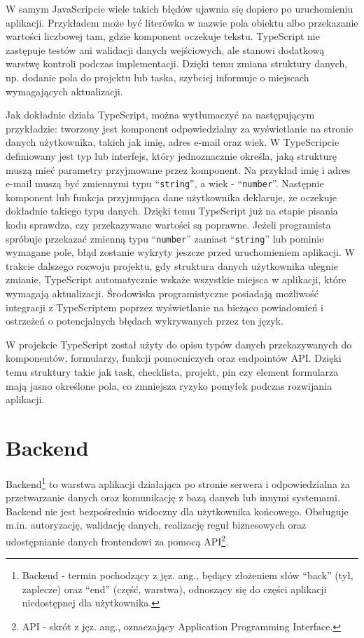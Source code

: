 \documentclass[12pt,a4paper,twoside]{report}
\newcommand{\FirstParagraph}{\noindent\ignorespaces}
\begin{document}
W samym JavaScripcie wiele takich błędów ujawnia się dopiero po uruchomieniu aplikacji. Przykładem może być literówka w nazwie pola obiektu albo przekazanie wartości liczbowej tam, gdzie komponent oczekuje tekstu. TypeScript nie zastępuje testów ani walidacji danych wejściowych, ale stanowi dodatkową warstwę kontroli podczas implementacji. Dzięki temu zmiana struktury danych, np. dodanie pola do projektu lub taska, szybciej informuje o miejscach wymagających aktualizacji.

Jak dokładnie działa TypeScript, można wytłumaczyć na następującym przykładzie: tworzony jest komponent odpowiedzialny za wyświetlanie na stronie danych użytkownika, takich jak imię, adres e-mail oraz wiek. W TypeScripcie definiowany jest typ lub interfejs, który jednoznacznie określa, jaką strukturę muszą mieć parametry przyjmowane przez komponent. Na przykład imię i adres e-mail muszą być zmiennymi typu ``\texttt{string}'', a wiek - ``\texttt{number}''. Następnie komponent lub funkcja przyjmująca dane użytkownika deklaruje, że oczekuje dokładnie takiego typu danych. Dzięki temu TypeScript już na etapie pisania kodu sprawdza, czy przekazywane wartości są poprawne. Jeżeli programista spróbuje przekazać zmienną typu ``\texttt{number}'' zamiast ``\texttt{string}'' lub pominie wymagane pole, błąd zostanie wykryty jeszcze przed uruchomieniem aplikacji. W trakcie dalszego rozwoju projektu, gdy struktura danych użytkownika ulegnie zmianie, TypeScript automatycznie wskaże wszystkie miejsca w aplikacji, które wymagają aktualizacji. Środowiska programistyczne posiadają możliwość integracji z TypeScriptem poprzez wyświetlanie na bieżąco powiadomień i ostrzeżeń o potencjalnych błędach wykrywanych przez ten język.

W projekcie TypeScript został użyty do opisu typów danych przekazywanych do komponentów, formularzy, funkcji pomocniczych oraz endpointów API. Dzięki temu struktury takie jak task, checklista, projekt, pin czy element formularza mają jasno określone pola, co zmniejsza ryzyko pomyłek podczas rozwijania aplikacji.

\chapter{Backend}

\FirstParagraph Backend\footnote{Backend - termin pochodzący z jęz. ang., będący złożeniem słów ``back'' (tył, zaplecze) oraz ``end'' (część, warstwa), odnoszący się do części aplikacji niedostępnej dla użytkownika.} to warstwa aplikacji działająca po stronie serwera i odpowiedzialna za przetwarzanie danych oraz komunikację z bazą danych lub innymi systemami. Backend nie jest bezpośrednio widoczny dla użytkownika końcowego. Obsługuje m.in. autoryzację, walidację danych, realizację reguł biznesowych oraz udostępnianie danych frontendowi za pomocą API\footnote{API - skrót z jęz. ang., oznaczający Application Programming Interface.}.
\end{document}
